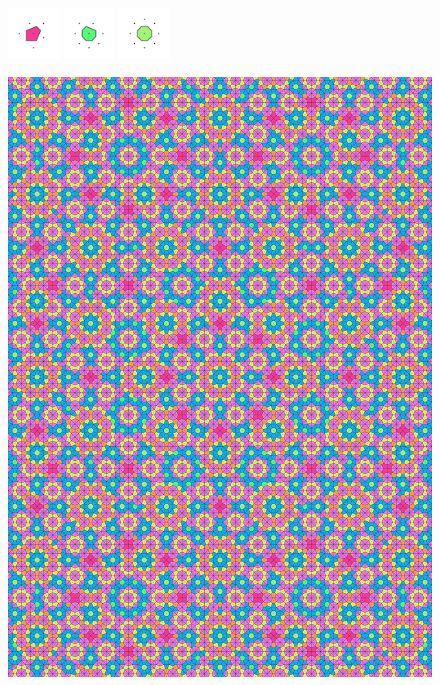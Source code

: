 \documentclass[text.tex]{subfiles}
\begin{document}
\begin{figure}[h!]
\includegraphics[width=0.12\textwidth]{img/results/circle8/circle8_165366_(10535_-4361alpha_4)_005.pdf}
\includegraphics[width=0.12\textwidth]{img/results/circle8/circle8_165366_(10535_-4361alpha_4)_006.pdf}
\includegraphics[width=0.12\textwidth]{img/results/circle8/circle8_165366_(10535_-4361alpha_4)_007.pdf}
\end{figure}

\begin{figure}[h!]
\centering
\includegraphics[width=1\textwidth]{img/results/circle8/quasi_circle_165366_(10535_-4361alpha_4).pdf}
\end{figure}
\end{document}
